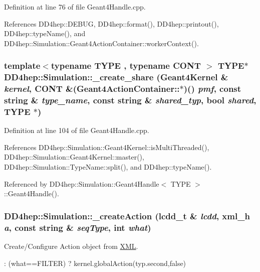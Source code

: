 Definition at line 76 of file Geant4Handle.cpp.

References DD4hep::DEBUG, DD4hep::format(), DD4hep::printout(), DD4hep::typeName(), and DD4hep::Simulation::Geant4ActionContainer::workerContext().\hypertarget{namespace_d_d4hep_1_1_simulation_a66508df08a361db2c99e9b5c265d9e23}{
\subsubsection[{\_\-create\_\-share}]{\setlength{\rightskip}{0pt plus 5cm}template$<$typename TYPE , typename CONT $>$ TYPE$\ast$ DD4hep::Simulation::\_\-create\_\-share ({\bf Geant4Kernel} \& {\em kernel}, \/  CONT \&(Geant4ActionContainer::$\ast$)() {\em pmf}, \/  const {\bf string} \& {\em type\_\-name}, \/  const {\bf string} \& {\em shared\_\-typ}, \/  bool {\em shared}, \/  TYPE $\ast$)}}
\label{namespace_d_d4hep_1_1_simulation_a66508df08a361db2c99e9b5c265d9e23}


Definition at line 104 of file Geant4Handle.cpp.

References DD4hep::Simulation::Geant4Kernel::isMultiThreaded(), DD4hep::Simulation::Geant4Kernel::master(), DD4hep::Simulation::TypeName::split(), and DD4hep::typeName().

Referenced by DD4hep::Simulation::Geant4Handle$<$ TYPE $>$::Geant4Handle().\hypertarget{namespace_d_d4hep_1_1_simulation_a21f9fcaa27a71abd2beeabcba2600bda}{
\subsubsection[{\_\-createAction}]{ DD4hep::Simulation::\_\-createAction ({\bf lcdd\_\-t} \& {\em lcdd}, \/  {\bf xml\_\-h} {\em a}, \/  const string \& {\em seqType}, \/  int {\em what})}}
\label{namespace_d_d4hep_1_1_simulation_a21f9fcaa27a71abd2beeabcba2600bda}


Create/Configure Action object from \hyperlink{namespace_d_d4hep_1_1_x_m_l}{XML}. 

: (what==FILTER) ? kernel.globalAction(typ.second,false) 

